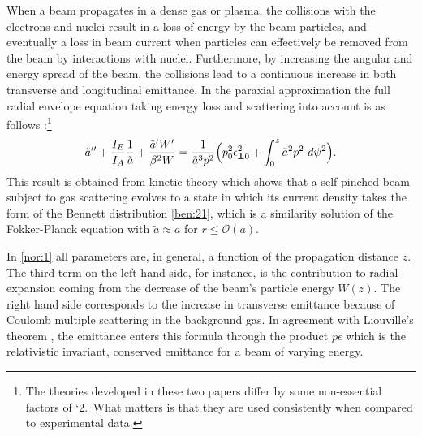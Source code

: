 \documentclass [12pt,a4paper,     ]{report} %
\newcommand{\tr}{\pmb{\perp}}         %
\begin{document}
When a beam propagates in a dense gas or plasma, the collisions with the electrons and nuclei result in a loss of energy by the beam particles, and eventually a loss in beam current when particles can effectively be removed from the beam by interactions with nuclei.  Furthermore, by increasing the angular and energy spread of the beam, the collisions lead to a continuous increase in both transverse and longitudinal emittance.  In the paraxial approximation the full radial envelope equation taking energy loss and scattering into account is as follows \cite{LEE--1976A,LEE--1976B}:\footnote{The theories developed in these two papers differ by some non-essential factors of `2.'  What matters is that they are used consistently when compared to experimental data.}
%
\begin{equation}\label{nor:1} %
    \tilde{a}'' + \frac{I_E}{I_A}\frac{1}{\tilde{a}} 
                + \frac{\tilde{a}'W'}{\beta^2W}
                = \frac{1}{\tilde{a}^3p^2}
   \Bigl(p_0^2\epsilon_{\tr 0}^2  + \int_0^z \tilde{a}^2p^2 ~ d\psi^2\Bigr).
\end{equation}
%  
This result is obtained from kinetic theory which shows \cite{LEE--1976B} that a self-pinched beam subject to gas scattering evolves to a state in which its current density takes the form of the Bennett distribution \eqref{ben:21}, which is a similarity solution of the Fokker-Planck equation with $\tilde{a} \approx a$ for $r \leq \mathcal{O}(a)$.

	In \eqref{nor:1} all parameters are, in general, a function of the propagation distance $z$. The third term on the left hand side, for instance, is the contribution to radial expansion coming from the decrease of the beam's particle energy $W(z)$.  The right hand  side corresponds to the increase in transverse emittance because of Coulomb multiple scattering in the background gas.  In agreement with Liouville's theorem \cite{LAWSO1977-}, the emittance enters this formula through the product $p\epsilon$ which is the relativistic invariant, conserved emittance for a beam of varying energy.
\end{document}
